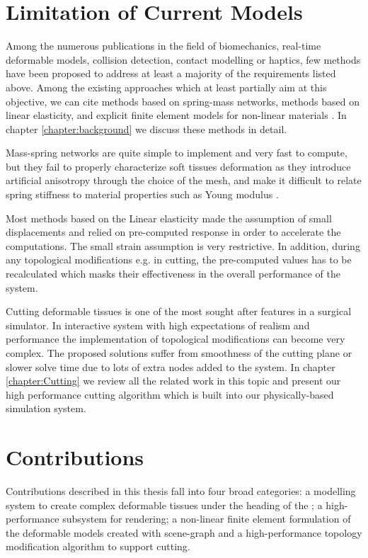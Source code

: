 \section{Limitation of Current Models}
Among the numerous publications in the field of biomechanics, real-time deformable models, collision detection, contact modelling or haptics, 
few methods have been proposed to address at least a majority of the requirements listed above. Among the existing approaches which at least 
partially aim at this objective, we can cite methods based on spring-mass networks, methods based on linear elasticity, and explicit finite element models 
for non-linear materials \cite{Gibson1997a,Meier2005}. In chapter \ref{chapter:background} we discuss these methods in detail.  

Mass-spring networks are quite simple to implement and very fast to compute, but they fail to properly characterize soft tissues deformation as they 
introduce artificial anisotropy through the choice of the mesh, and make it difficult to relate spring stiffness to material properties such as Young modulus 
\cite{Courtecuisse2010}.

Most methods based on the Linear elasticity made the assumption of small displacements and relied on pre-computed response in order to accelerate the 
computations. The small strain assumption is very restrictive. In addition, during any topological modifications e.g. in cutting, the pre-computed values 
has to be recalculated which masks their effectiveness in the overall performance of the system.

Cutting deformable tissues is one of the most sought after features in a surgical simulator. In interactive system with high expectations of realism and 
performance the implementation of topological modifications can become very complex. The proposed solutions suffer from smoothness of the cutting plane or slower
solve time due to lots of extra nodes added to the system. In chapter \ref{chapter:Cutting} we review all the related work in this topic and present our
high performance cutting algorithm which is built into our physically-based simulation system.


\section{Contributions}
Contributions described in this thesis fall into four broad categories: a modelling system to create complex deformable tissues under the heading of the 
\blob; a high-performance subsystem for rendering; a non-linear finite element formulation of the deformable models created with \blob scene-graph and
a high-performance topology modification algorithm to support cutting. 


